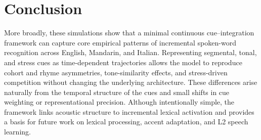 \section{Conclusion}

More broadly, these simulations show that a minimal continuous cue–integration framework can capture core empirical patterns of incremental spoken-word recognition across English, Mandarin, and Italian. Representing segmental, tonal, and stress cues as time-dependent trajectories allows the model to reproduce cohort and rhyme asymmetries, tone-similarity effects, and stress-driven competition without changing the underlying architecture. These differences arise naturally from the temporal structure of the cues and small shifts in cue weighting or representational precision. Although intentionally simple, the framework links acoustic structure to incremental lexical activation and provides a basis for future work on lexical processing, accent adaptation, and L2 speech learning.